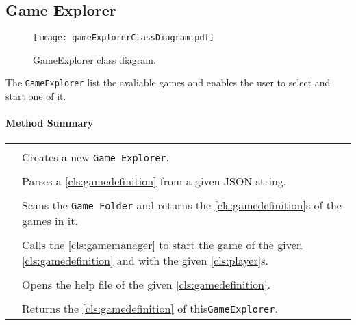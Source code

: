 \subsection{Game Explorer}

\begin{figure}[h]
	\centering
	\texttt{[image: gameExplorerClassDiagram.pdf]}
	\caption{GameExplorer class diagram.}
	\label{img:gameExplorerClassDiagram}
\end{figure}
\pagebreak

The \texttt{GameExplorer} list the avaliable games and enables the user to select and start one of it.

\centerdash

\paragraph*{Method Summary}
\paragraph*{}
\begin{longtable}{Lp{10cm}}
	\startmethodtable
	 \\
	& Creates a new \texttt{Game Explorer}. \\
	 \\
	& Parses a \ref{cls:gamedefinition} from a given JSON string. \\
	 \\
	& Scans the \texttt{Game Folder} and returns the \ref{cls:gamedefinition}s of the games in it. \\
	 \\
	& Calls the \ref{cls:gamemanager} to start the game of the given \ref{cls:gamedefinition} and with the given \ref{cls:player}s. \\
	 \\
	& Opens the help file of the given \ref{cls:gamedefinition}. \\
	 \\
	& Returns the \ref{cls:gamedefinition} of this\texttt{GameExplorer}. \\
	\hline
\end{longtable}

